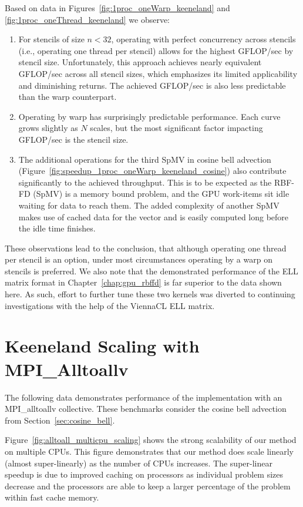 Based on data in Figures~\ref{fig:1proc_oneWarp_keeneland} and \ref{fig:1proc_oneThread_keeneland} we observe: 
\begin{enumerate} 
\item For stencils of size $n < 32$, operating with perfect concurrency across stencils (i.e., operating one thread per stencil) allows for the highest GFLOP/sec by stencil size. Unfortunately, this approach achieves nearly equivalent GFLOP/sec across all stencil sizes, which emphasizes its limited applicability and diminishing returns. The achieved GFLOP/sec is also less predictable than the warp counterpart. 
\item Operating by warp has surprisingly predictable performance. Each curve grows slightly as $N$ scales, but the most significant factor impacting GFLOP/sec is the stencil size.
\item The additional operations for the third SpMV in cosine bell advection (Figure~\ref{fig:speedup_1proc_oneWarp_keeneland_cosine}) also contribute significantly to the achieved throughput. This is to be expected as the RBF-FD (SpMV) is a memory bound problem, and the GPU work-items sit idle waiting for data to reach them. The added complexity of another SpMV makes use of cached data for the vector and is easily computed long before the idle time finishes. 
\end{enumerate}
These observations lead to the conclusion, that although operating one thread per stencil is an option, under most circumstances operating by a warp on stencils is preferred. We also note that the demonstrated performance of the ELL matrix format in Chapter~\ref{chap:gpu_rbffd} is far superior to the data shown here. As such, effort to further tune these two kernels was diverted to continuing investigations with the help of the ViennaCL ELL matrix. 


\section{Keeneland Scaling with MPI\_Alltoallv}

The following data demonstrates performance of the implementation with an MPI\_alltoallv collective. These benchmarks consider the cosine bell advection from Section~\ref{sec:cosine_bell}. 

Figure~\ref{fig:alltoall_multicpu_scaling} shows the strong scalability of our method on multiple CPUs. This figure demonstrates that our method does scale linearly (almost super-linearly) as the number of CPUs increases. 
The super-linear speedup is due to improved caching on processors as individual problem sizes decrease and the processors are able to keep a larger percentage of the problem within fast cache memory.

